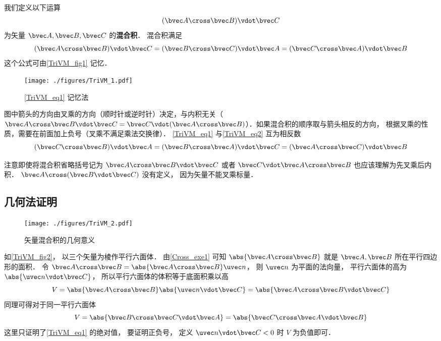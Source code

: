 
我们定义以下运算
\begin{equation}
(\bvec A \cross \bvec B) \vdot \bvec C
\end{equation}
为矢量 $\bvec A, \bvec B, \bvec C$ 的\textbf{混合积}． 混合积满足
\begin{equation}\label{TriVM_eq1}
(\bvec A \cross \bvec B) \vdot \bvec C = (\bvec B \cross \bvec C) \vdot \bvec A = (\bvec C \cross \bvec A) \vdot \bvec B 
\end{equation} 
这个公式可由\autoref{TriVM_fig1} 记忆．
\begin{figure}[ht]
\centering %
\texttt{[image: ./figures/TriVM\_1.pdf]}
\caption{\autoref{TriVM_eq1} 记忆法}\label{TriVM_fig1}
\end{figure}
图中箭头的方向由叉乘的方向（顺时针或逆时针）决定，与内积无关（$\bvec A\cross \bvec B \vdot \bvec C = \bvec C \vdot (\bvec A \cross \bvec B)$）．如果混合积的顺序取与箭头相反的方向， 根据叉乘的性质，需要在前面加上负号（叉乘不满足乘法交换律）． \autoref{TriVM_eq1} 与\autoref{TriVM_eq2} 互为相反数
\begin{equation}\label{TriVM_eq2}
(\bvec C \cross \bvec B) \vdot \bvec A = (\bvec B \cross \bvec A) \vdot \bvec C = (\bvec A \cross \bvec C) \vdot \bvec B
\end{equation}

注意即使将混合积省略括号记为 $\bvec A \cross \bvec B \vdot \bvec C$ 或者 $\bvec C \vdot \bvec A \cross \bvec B$ 也应该理解为先叉乘后内积． $\bvec A \cross (\bvec B \vdot \bvec C)$ 没有定义， 因为矢量不能叉乘标量．

\subsection{几何法证明}

\begin{figure}[ht]
\centering
\texttt{[image: ./figures/TriVM\_2.pdf]}
\caption{矢量混合积的几何意义} \label{TriVM_fig2}
\end{figure}

如\autoref{TriVM_fig2}， 以三个矢量为棱作平行六面体． 由\autoref{Cross_exe1} 可知 $\abs{\bvec A \cross \bvec B}$ 就是 $\bvec A,\bvec B$ 所在平行四边形的面积． 令 $\bvec A \cross \bvec B = \abs{\bvec A \cross \bvec B} \uvec n$， 则 $\uvec n$ 为平面的法向量， 平行六面体的高为 $\abs{\uvec n \vdot \bvec C}$， 所以平行六面体的体积等于底面积乘以高
\begin{equation}
V = \abs{\bvec A \cross \bvec B} \abs{\uvec n \vdot \bvec C} = \abs{\bvec A \cross \bvec B \vdot \bvec C}
\end{equation}
同理可得对于同一平行六面体
\begin{equation}
V = \abs{\bvec B \cross \bvec C \vdot \bvec A} = \abs{\bvec C \cross \bvec A \vdot \bvec B} 
\end{equation}  
这里只证明了\autoref{TriVM_eq1} 的绝对值， 要证明正负号， 定义 $\uvec n \vdot \bvec C < 0$ 时 $V$ 为负值即可．

